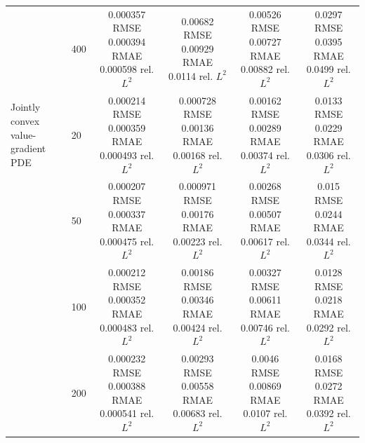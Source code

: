 \begin{tabular}{llcccc}
 & 400 & \shortstack{0.000357 RMSE\\0.000394 RMAE\\0.000598 rel. $L^2$} & \shortstack{0.00682 RMSE\\0.00929 RMAE\\0.0114 rel. $L^2$} & \shortstack{0.00526 RMSE\\0.00727 RMAE\\0.00882 rel. $L^2$} & \shortstack{0.0297 RMSE\\0.0395 RMAE\\0.0499 rel. $L^2$} \\
\addlinespace
Jointly convex value-gradient PDE & 20 & \shortstack{0.000214 RMSE\\0.000359 RMAE\\0.000493 rel. $L^2$} & \shortstack{0.000728 RMSE\\0.00136 RMAE\\0.00168 rel. $L^2$} & \shortstack{0.00162 RMSE\\0.00289 RMAE\\0.00374 rel. $L^2$} & \shortstack{0.0133 RMSE\\0.0229 RMAE\\0.0306 rel. $L^2$} \\
 & 50 & \shortstack{0.000207 RMSE\\0.000337 RMAE\\0.000475 rel. $L^2$} & \shortstack{0.000971 RMSE\\0.00176 RMAE\\0.00223 rel. $L^2$} & \shortstack{0.00268 RMSE\\0.00507 RMAE\\0.00617 rel. $L^2$} & \shortstack{0.015 RMSE\\0.0244 RMAE\\0.0344 rel. $L^2$} \\
 & 100 & \shortstack{0.000212 RMSE\\0.000352 RMAE\\0.000483 rel. $L^2$} & \shortstack{0.00186 RMSE\\0.00346 RMAE\\0.00424 rel. $L^2$} & \shortstack{0.00327 RMSE\\0.00611 RMAE\\0.00746 rel. $L^2$} & \shortstack{0.0128 RMSE\\0.0218 RMAE\\0.0292 rel. $L^2$} \\
 & 200 & \shortstack{0.000232 RMSE\\0.000388 RMAE\\0.000541 rel. $L^2$} & \shortstack{0.00293 RMSE\\0.00558 RMAE\\0.00683 rel. $L^2$} & \shortstack{0.0046 RMSE\\0.00869 RMAE\\0.0107 rel. $L^2$} & \shortstack{0.0168 RMSE\\0.0272 RMAE\\0.0392 rel. $L^2$} \\

\end{tabular}
